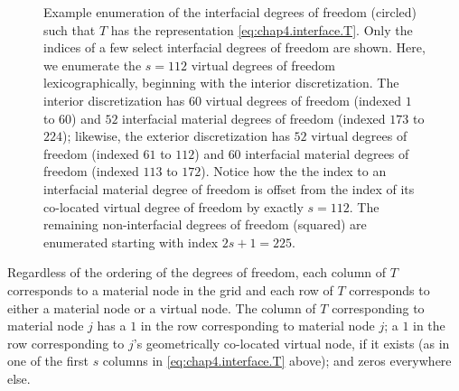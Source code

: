 \setlength{\figurewidth}{0.50\textwidth}
\begin{figure}[htbp]
\centering
{}
\caption{Example enumeration of the interfacial degrees of freedom (circled) such that $T$ has the representation \eqref{eq:chap4.interface.T}. Only the indices of a few select interfacial degrees of freedom are shown. Here, we enumerate the $s = 112$ virtual degrees of freedom lexicographically, beginning with the interior discretization. The interior discretization has $60$ virtual degrees of freedom (indexed $1$ to $60$) and $52$ interfacial material degrees of freedom (indexed $173$ to $224$); likewise, the exterior discretization has $52$ virtual degrees of freedom (indexed $61$ to $112$) and $60$ interfacial material degrees of freedom (indexed $113$ to $172$). Notice how the the index to an interfacial material degree of freedom is offset from the index of its co-located virtual degree of freedom by exactly $s = 112$. The remaining non-interfacial degrees of freedom (squared) are enumerated starting with index $2s + 1 = 225$.}
\label{fig:chap4.dofenumerationforT}
\end{figure}

Regardless of the ordering of the degrees of freedom, each column of $T$ corresponds to a material node in the grid and each row of $T$ corresponds to either a material node or a virtual node. The column of $T$ corresponding to material node $j$ has a $1$ in the row corresponding to material node $j$; a $1$ in the row corresponding to $j$'s geometrically co-located virtual node, if it exists (as in one of the first $s$ columns in \eqref{eq:chap4.interface.T} above); and zeros everywhere else.

